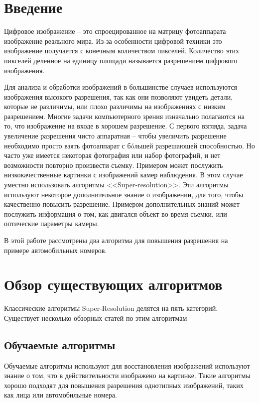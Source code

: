 \section{Введение}
Цифровое изображение -- это спроецированное на матрицу фотоаппарата изображение реального мира. Из-за особенности
цифровой техники это изображение получается с конечным количеством пикселей. Количество этих пикселей деленное на
единицу площади называется разрешением цифрового изображения.

Для анализа и обработки изображений в большинстве случаев используются изображения высокого разрешения, так как они
позволяют увидеть детали, которые не различимы, или плохо различимы на изображениях с низким разрешением. Многие задачи
компьютерного зрения изначально полагаются на то, что изображение на входе в хорошем разрешение. С первого взгляда,
задача увеличение разрешения чисто аппаратная -- чтобы увеличить разрешение необходимо просто взять фотоаппарат с
б\'oльшей разрешающей способностью. Но часто уже имеется некоторая фотография или набор фотографий, и нет возможности
повторно произвести съемку. Примером может послужить низкокачественные картинки с изображений камер наблюдения. В этом
случае уместно использовать алгоритмы <<Super-resolution>>. Эти алгоритмы используют некоторое дополнительное знание о
изображении, для того, чтобы качественно повысить разрешение. Примером дополнительных знаний может послужить информация
о том, как двигался объект во время съемки, или оптические параметры камеры.

В этой работе рассмотрены два алгоритма для повышения разрешения на примере автомобильных номеров.

\section{Обзор существующих алгоритмов}
Классические алгоритмы Super-Resolution делятся на пять категорий.  Существует
несколько обзорных статей по этим алгоритмам \cite{ParkS.C.2003,tian2011survey}

\subsection{Обучаемые алгоритмы}
Обучаемые алгоритмы используют для восстановления изображений используют знание о том,
что в действительности изображено на картинке. Такие алгоритмы хорошо подходят для повышения разрешения однотипных
изображений, таких как лица или автомобильные номера.

